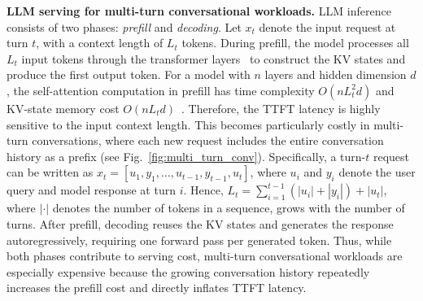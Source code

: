 \documentclass{article}
\newcommand{\jiny}[1]{\textcolor{orange}{[Jiny: #1]}}
\newcommand{\hasan}[1]{\textcolor{blue}{[Hasan: #1]}}
\newcommand{\bo}[1]{\textcolor{red}{[Bo: #1]}}
\begin{document}
\textbf{LLM serving for multi-turn conversational workloads.}
LLM inference consists of two phases: \emph{prefill} and \emph{decoding}. Let $x_t$ denote the input request at turn $t$, with a context length of $L_t$ tokens. During prefill, the model processes all $L_t$ input tokens through the transformer layers~\cite{vaswani2017attention} to construct the KV states and produce the first output token.
For a model with $n$ layers and hidden dimension $d$, the self-attention computation in prefill has time complexity $O(nL_t^2d)$ and KV-state memory cost $O(nL_td)$~\cite{vaswani2017attention}. Therefore, the TTFT latency is highly sensitive to the input context length. This becomes particularly costly in multi-turn conversations, where each new request includes the entire conversation history as a prefix (see Fig.~\ref{fig:multi_turn_conv}). Specifically, a turn-$t$ request can be written as $x_t=[u_1,y_1,\ldots,u_{t-1},y_{t-1},u_t]$, where $u_i$ and $y_i$ denote the user query and model response at turn $i$. %
Hence, $L_t=\sum_{i=1}^{t-1}(|u_i|+|y_i|)+|u_t|$, where $|\cdot|$ denotes the number of tokens in a sequence, grows with the number of turns. After prefill, decoding reuses the KV states and generates the response autoregressively, requiring one forward pass per generated token. Thus, while both phases contribute to serving cost, multi-turn conversational workloads are especially expensive because the growing conversation history repeatedly increases the prefill cost and directly inflates TTFT latency.


\end{document}
